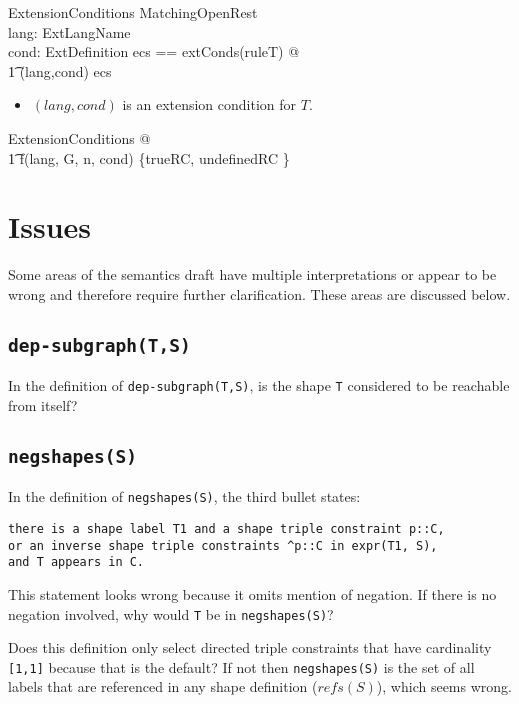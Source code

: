 \documentclass{article}
\begin{document}
\begin{schema}{ExtensionConditions}
	MatchingOpenRest \\
	lang: ExtLangName \\
	cond: ExtDefinition
\where
	\LET ecs == extConds(ruleT) @ \\
\t1		(lang,cond) \in \ran ecs
\end{schema}
\begin{itemize}
\item $(lang, cond)$ is an extension condition for $T$.
\end{itemize}

\begin{zed}
	\forall ExtensionConditions @ \\
\t1		f(lang, G, n, cond) \in \{trueRC, undefinedRC \}
\end{zed}

\section{Issues}
\label{sec-issues}

Some areas of the semantics draft have multiple interpretations or appear to be wrong and therefore require further clarification.
These areas are discussed below.

\subsection{{\tt dep-subgraph(T,S)}}
In the definition of {\tt dep-subgraph(T,S)}, is the shape {\tt T} considered to be reachable from itself?

\subsection{{\tt negshapes(S)}}
In the definition of {\tt negshapes(S)}, the third bullet states:

\begin{verbatim}
there is a shape label T1 and a shape triple constraint p::C, 
or an inverse shape triple constraints ^p::C in expr(T1, S), 
and T appears in C.
\end{verbatim}

This statement looks wrong because it omits mention of negation. 
If there is no negation involved, why would {\tt T} be in {\tt negshapes(S)}?

Does this definition only select directed triple constraints that have cardinality {\tt [1,1]}
because that is the default?
If not then {\tt negshapes(S)} is the set of all labels that are referenced in any shape definition ($refs(S)$), which seems wrong.
\end{document}
